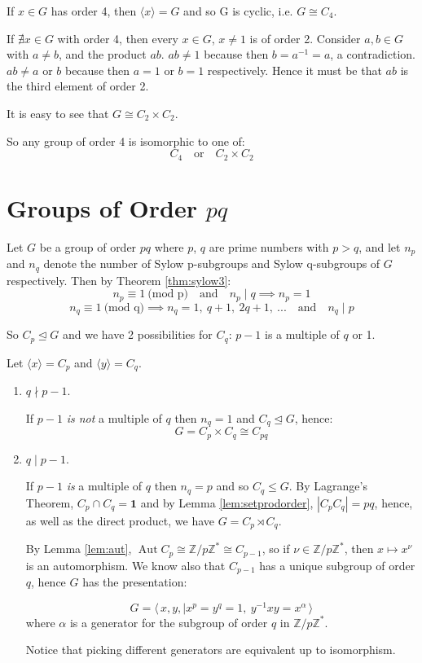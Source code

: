 \documentclass[a4paper, oneside, 12pt, final]{article}
\theoremstyle{definition}
\DeclareMathOperator{\Aut}{Aut}
\newcommand{\Z}{\mathbb{Z}}
\newcommand{\Zn}[1]{\Z/#1\Z}
\begin{document}
If \(x \in G\) has order 4, then \(\langle x \rangle = G\) and so G is cyclic,
i.e. \(G \cong C_4\).

If \(\nexists x \in G\) with order 4, then every \(x \in G\), \(x \neq 1\) is
of order 2.
Consider \(a, b \in G\) with \(a \neq b\), and the product \(ab\).
\(ab \neq 1\) because then \(b = a^{-1} = a\), a contradiction.
\(ab \neq a\) or \(b\) because then \(a = 1\) or \(b = 1\) respectively.
Hence it must be that \(ab\) is the third element of order 2.

It is easy to see that \(G \cong C_2 \times C_2\).

So any group of order 4 is isomorphic to one of:
\[C_4 \quad \text{or} \quad C_2 \times C_2\]

\section{Groups of Order \(pq\)}
Let \(G\) be a group of order \(pq\) where \(p\), \(q\) are prime numbers with
\(p > q\), and let \(n_p\) and \(n_q\) denote the number of Sylow p-subgroups
and Sylow q-subgroups of \(G\) respectively.
Then by Theorem \ref{thm:sylow3}:
\[n_p \equiv 1 \ \text{(mod p)} \quad \text{and} \quad n_p \mid q \implies n_p
= 1\]
\[n_q \equiv 1 \ \text{(mod q)} \implies n_q = 1,\ q+1,\ 2q+1,\ ... \quad
\text{and} \quad n_q \mid p\]

So \(C_p \unlhd G\) and we have 2 possibilities for \(C_q\): \(p-1\) is a
multiple of \(q\) or 1.

Let \(\langle x \rangle = C_p\) and \(\langle y \rangle = C_q\).

\begin{enumerate}
    \item \(q \nmid p - 1\).

        If \(p-1\) \emph{is not} a multiple of \(q\) then \(n_q = 1\) and \(C_q
        \unlhd G\), hence: \[G = C_p \times C_q \cong C_{pq}\]

    \item \( q \mid p - 1\).

        If \(p-1\) \emph{is}  a multiple of \(q\) then \(n_q = p\) and so \(C_q
        \leqslant G\).
        By Lagrange's Theorem, \(C_p \cap C_q = \bm{1}\) and by Lemma
        \ref{lem:setprodorder}, \(|C_pC_q| = pq\), hence, as well as the direct
        product, we have \(G = C_p \rtimes C_q\).

        By Lemma \ref{lem:aut}, \(\Aut{C_p} \cong \Zn{p}^* \cong C_{p-1}\), so
        if \(\nu \in \Zn{p}^*\), then \(x \mapsto x^\nu\) is an automorphism.
        We know also that \(C_{p-1}\) has a unique subgroup of order \(q\),
        hence \(G\) has the presentation:

        \[G = \langle \, x, y, \mid x^p = y^q = 1,\ y^{-1}xy = x^\alpha \, \rangle\]
        where \(\alpha\) is a generator for the subgroup of order \(q\) in
        \(\Zn{p}^*\).

        Notice that picking different generators are equivalent up to
        isomorphism.

\end{enumerate}
\end{document}
